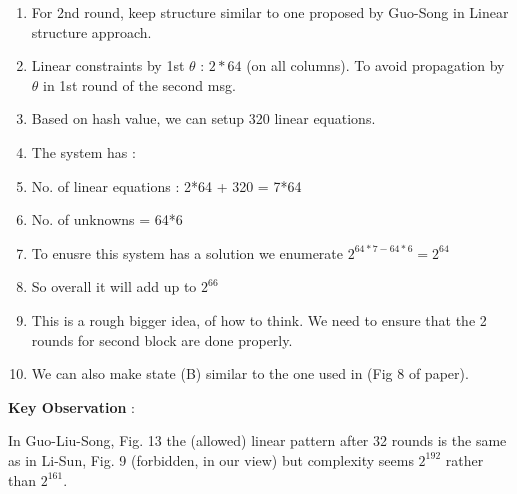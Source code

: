 \documentclass{article}
\begin{document}
\begin{enumerate}
    \item For 2nd round, keep structure similar to one proposed by Guo-Song in Linear structure approach.
    \item Linear constraints by 1st $\theta$ : $2*64$ (on all columns). To avoid propagation by $\theta$ in 1st round of the second msg.
    \item Based on hash value, we can setup 320 linear equations.
    \item The system has :
    \item No. of linear equations : 2*64 + 320 = 7*64
    \item No. of unknowns = 64*6
    \item To enusre this system has a solution we enumerate $2^{64*7-64*6} = 2^{64}$
    \item So overall it will add up to $2^{66}$
    \item This is a rough bigger idea, of how to think. We need to ensure that the 2 rounds for second block are done properly.
    \item We can also make state (B) similar to the one used in (Fig 8 of paper).
\end{enumerate}

\newpage
\textbf{Key Observation }: 

In Guo-Liu-Song, Fig. 13 the (allowed) linear pattern after 32 rounds is the same as in Li-Sun, Fig. 9 (forbidden, in our view) but complexity seems $2^{192}$ rather than $2^{161}$.
\end{document}
